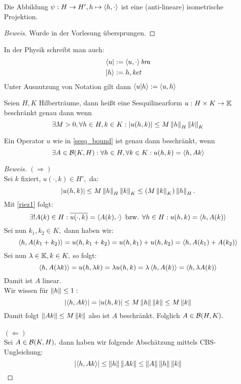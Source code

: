 \begin{theorem} \label{riez2}
Die Abbildung $\psi: H \to H', h \mapsto \left\langle h, \cdot\right\rangle$ ist eine (anti-lineare) isometrische Projektion.
\begin{proof}[Beweis] Wurde in der Vorlesung übersprungen.
\end{proof}
\end{theorem}


\begin{rem}
    In der Physik schreibt man auch:
    \begin{align*}
        & \langle u | := \left\langle u, \cdot\right\rangle \textit{bra} \\
        & |h\rangle := h, \textit{ket} \\
    \end{align*} Unter Ausnutzung von Notation gilt dann $\left\langle u | h\right\rangle := \left\langle u, h\right\rangle$
\end{rem}

\begin{definition} \label{sesq_bound}
    Seien $H, K$ Hilberträume, dann heißt eine Sesquilinearform $u: H \times K \to \mathbb{K}$ beschränkt genau dann wenn \[\exists M > 0, \forall h \in H, k \in K: \left\lvert u(h, k) \right\rvert \leq M \left\lVert h\right\rVert_H \left\lVert k\right\rVert_K\]
\end{definition}

\begin{theorem}
	\label{sesq_darstellung}
Ein Operator $u$ wie in \ref{sesq_bound} ist genau dann beschränkt, wenn \[\exists A \in \mathcal{B}(K, H): \forall h \in H, \forall k \in K: u(h, k) = \left\langle h, Ak\right\rangle\]

\begin{proof}[Beweis] $(\Longrightarrow)$ \\
Sei $k$ fixiert, $u(\cdot, k) \in H',$ da:
\[\left\lvert u(h, k) \right\rvert \leq M \left\lVert h\right\rVert_H \left\lVert k\right\rVert_K \leq (M \left\lVert k\right\rVert_K)\left\lVert h\right\rVert_H.\] Mit \ref{riez1} folgt:
\[\exists!A(k) \in H: \overline{u(\cdot, k)} = \left\langle A(k), \cdot\right\rangle \text{ bzw. } \forall h \in H: u(h, k) = \left\langle h, A(k)\right\rangle\]
Sei nun $k_1, k_2 \in K,$ dann haben wir:
\[\left\langle h, A(k_1 + k_2)\right\rangle = u(h, k_1 + k_2) = u(h, k_1)+u(h, k_2) = \left\langle h, A(k_1) + A(k_2)\right\rangle\] Sei nun $\lambda \in \mathbb{K}, k \in K,$ so folgt: \[\left\langle h, A(\lambda k)\right\rangle = u(h, \lambda k)= \lambda u(h, k) = \lambda \left\langle h, A(k)\right\rangle = \left\langle h, \lambda A(k)\right\rangle\] Damit ist $A$ linear.\\ 
Wir wissen für $\left\lVert h\right\rVert \leq 1:$ \[\left\lvert \left\langle h, Ak\right\rangle \right\rvert = \left\lvert u(h, k) \right\rvert \leq M \left\lVert h\right\rVert\left\lVert k\right\rVert \leq M\left\lVert k\right\rVert\] Damit folgt $\left\lVert Ak\right\rVert \leq M \left\lVert k\right\rVert$ also ist $A$ beschränkt. Folglich $A \in \mathcal{B}(H, K).$ \\
\\
$(\Longleftarrow)$ \\
Sei $A \in \mathcal{B}(K, H),$ dann haben wir folgende Abschätzung mittels CBS-Ungleichung: \[\left\lvert \left\langle h, Ak\right\rangle \right\rvert \leq \left\lVert h\right\rVert\left\lVert Ak\right\rVert \leq \left\lVert A\right\rVert\left\lVert h\right\rVert\left\lVert k\right\rVert\]
\end{proof}
\end{theorem}



